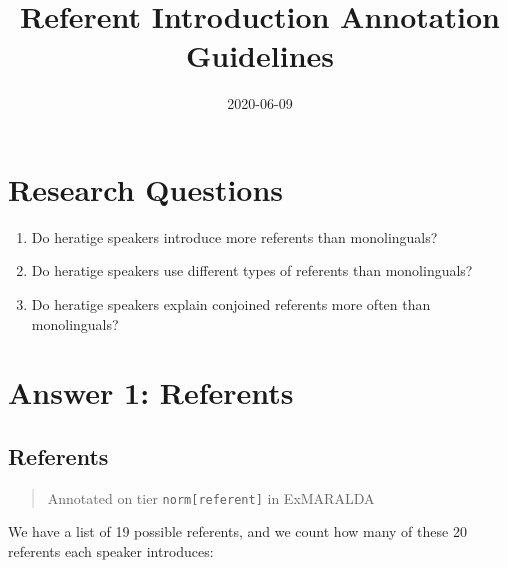 \documentclass[
]{book}
\title{Referent Introduction Annotation Guidelines}
\author{}
\date{\vspace{-2.5em}2020-06-09}
\begin{document}
\maketitle

{
\setcounter{tocdepth}{1}
\tableofcontents
}
\hypertarget{research-questions}{%
\chapter{Research Questions}\label{research-questions}}

\begin{enumerate}
\def\labelenumi{\arabic{enumi}.}
\item
  Do heratige speakers introduce more referents than monolinguals?
\item
  Do heratige speakers use different types of referents than monolinguals?
\item
  Do heratige speakers explain conjoined referents more often than monolinguals?
\end{enumerate}

\hypertarget{answer-1-referents}{%
\chapter{Answer 1: Referents}\label{answer-1-referents}}

\hypertarget{referents}{%
\section{Referents}\label{referents}}

\begin{quote}
Annotated on tier \texttt{norm{[}referent{]}} in ExMARALDA
\end{quote}

We have a list of 19 possible referents, and we count how many of these 20 referents each speaker introduces:
\end{document}
